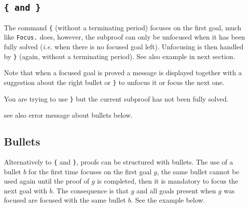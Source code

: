 \subsection[\tt \{ \textrm{and} \}]{\tt \{ \textrm{and} \}\comindex{\{}\comindex{\}}}\label{curlybacket}
The command {\tt \{} (without a terminating period) focuses on the
first goal, much like {\tt Focus.} does, however, the subproof can
only be unfocused when it has been fully solved (\emph{i.e.} when
there is no focused goal left). Unfocusing is then handled by {\tt \}}
(again, without a terminating period). See also example in next section.

Note that when a focused goal is proved a message is displayed
together with a suggestion about the right bullet or {\tt \}} to
unfocus it or focus the next one.


\begin{ErrMsgs}
\item {} You are trying to use {\tt \}} but the current subproof
  has not been fully solved.
\item {}
\item {}
\item see also error message about bullets below.
\end{ErrMsgs}

\subsection[Bullets]{Bullets
  }\label{bullets}
Alternatively to {\tt \{} and {\tt \}}, proofs can be structured with
bullets. The use of a bullet $b$ for the first time focuses on the
first goal $g$, the same bullet cannot be used again until the proof
of $g$ is completed, then it is mandatory to focus the next goal with $b$. The
consequence is that $g$ and all goals present when $g$ was focused are
focused with the same bullet $b$. See the example below.

